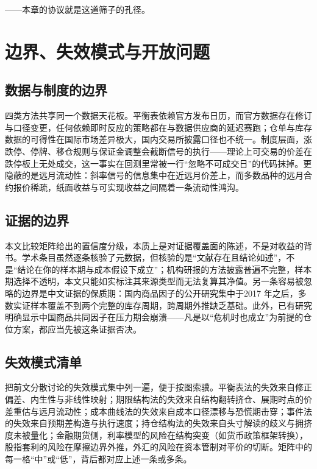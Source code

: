 \documentclass[12pt,a4paper]{ctexart}
\begin{document}
——本章的协议就是这道筛子的孔径。

\section{边界、失效模式与开放问题}

\subsection{数据与制度的边界}

四类方法共享同一个数据天花板。平衡表依赖官方发布日历，而官方数据存在修订与口径变更，任何依赖即时反应的策略都在与数据供应商的延迟赛跑；仓单与库存数据的可得性在国际市场差异极大，国内交易所披露口径也不统一。制度层面，涨跌停、停牌、移仓规则与保证金调整会截断信号的执行——理论上可交易的价差在跌停板上无处成交，这一事实在回测里常被一行“忽略不可成交日”的代码抹掉。更隐蔽的是远月流动性：斜率信号的信息集中在近远月价差上，而多数品种的远月合约报价稀疏，纸面收益与可实现收益之间隔着一条流动性鸿沟。

\subsection{证据的边界}

本文比较矩阵给出的置信度分级，本质上是对证据覆盖面的陈述，不是对收益的背书。学术条目虽然逐条核验了元数据，但核验的是“文献存在且结论如述”，不是“结论在你的样本期与成本假设下成立”；机构研报的方法披露普遍不完整，样本期选择不透明，本文只能如实标注其来源类型而无法复算其净值。另一条容易被忽略的边界是中文证据的保质期：国内商品因子的公开研究集中于2017 年之后，多数实证样本覆盖不到两个完整的库存周期，跨周期外推缺乏基础。此外，已有研究明确显示中国商品共同因子在压力期会崩溃\cite{89}——凡是以“危机时也成立”为前提的仓位方案，都应当先被这条证据否决。

\subsection{失效模式清单}

把前文分散讨论的失效模式集中列一遍，便于按图索骥。平衡表法的失效来自修正偏差、内生性与非线性映射；期限结构法的失效来自结构翻转挤仓、展期时点的价差重估与远月流动性；成本曲线法的失效来自成本口径漂移与恐慌期击穿；事件法的失效来自预期差构造与执行速度；持仓结构法的失效来自头寸解读的歧义与拥挤度未被量化；金融期货侧，利率模型的风险在结构突变（如货币政策框架转换），股指套利的风险在摩擦边界外推，外汇的风险在资本管制对平价的切断。矩阵中的每一格“中”或“低”，背后都对应上述一条或多条。
\end{document}
